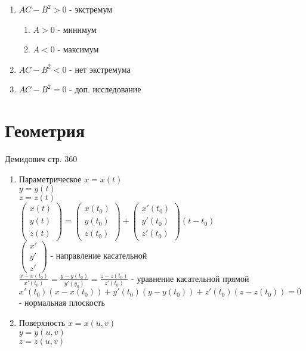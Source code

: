 \documentclass{article}
\begin{document}
\begin{enumerate}
\item \(AC - B^2 > 0\) - экстремум
\begin{enumerate}
\item \(A > 0\) - минимум
\item \(A < 0\) - максимум
\end{enumerate}
\item \(AC - B^2 < 0\) - нет экстремума
\item \(AC - B^2 = 0\) - доп. исследование
\end{enumerate}
\section{Геометрия}
\label{sec:org30dce11}
Демидович стр. 360
\begin{enumerate}
\item Параметрическое
\(x = x(t)\) \\
\(y = y(t)\) \\
\(z = z(t)\) \\
\(\begin{pmatrix} x(t) \\ y(t) \\ z(t) \end{pmatrix} = \begin{pmatrix} x(t_0) \\ y(t_0) \\ z(t_0) \end{pmatrix} + \begin{pmatrix} x'(t_0) \\ y'(t_0) \\ z'(t_0) \end{pmatrix}(t - t_0)\) \\
\(\begin{pmatrix} x' \\ y' \\ z'\end{pmatrix}\) - направление касательной \\
\(\frac{x - x(t_0)}{x'(t_0)} = \frac{y - y(t_0)}{y'(y_0)} = \frac{z - z(t_0)}{z'(t_0)}\) - уравнение касательной прямой \\
\(x'(t_0)(x - x(t_0)) + y'(t_0)(y - y(t_0)) + z'(t_0)(z - z(t_0)) = 0\) - нормальная плоскость
\item Поверхность
\(x = x(u, v)\) \\
\(y = y(u, v)\) \\
\(z = z(u, v)\) \\

\end{enumerate}
\end{document}

